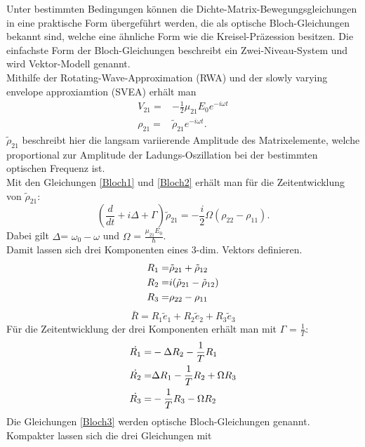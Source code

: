 Unter bestimmten Bedingungen können die Dichte-Matrix-Bewegungsgleichungen in eine praktische Form übergeführt werden, die als optische Bloch-Gleichungen bekannt sind, welche eine ähnliche Form wie die Kreisel-Präzession besitzen. Die einfachste Form der Bloch-Gleichungen beschreibt ein Zwei-Niveau-System und wird Vektor-Modell genannt.\\

Mithilfe der Rotating-Wave-Approximation (RWA) und der slowly varying envelope approxiamtion (SVEA) erhält man
\begin{align}
    V_{21}=& -\frac{1}{2}\mu_{21}E_0e^{-i\omega t} \label{Bloch1}\\
    \rho_{21} =& \tilde{\rho}_{21}e^{-i\omega t} \label{Bloch2}.
\end{align}
$\tilde{\rho}_{21}$ beschreibt hier die langsam variierende Amplitude des Matrixelemente, welche proportional zur Amplitude der Ladungs-Oszillation bei der bestimmten optischen Frequenz ist.\\
Mit den Gleichungen \ref{Bloch1} und \ref{Bloch2} erhält man für die Zeitentwicklung von $\tilde{\rho}_{21}$:
\begin{equation}
    \left( \frac{d}{dt} + i\Delta + \Gamma\right)\tilde{\rho}_{21}=-\frac{i}{2}\Omega(\rho_{22}-\rho_{11}).
\end{equation}
Dabei gilt $\Delta$= $\omega_0 - \omega$ und $\Omega$ = $\frac{\mu_{21}E_0}{\hbar}$.\\
Damit lassen sich drei Komponenten eines 3-dim. Vektors definieren.
\begin{align}
    R_1 =& \tilde{\rho}_{21} + \tilde{\rho}_{12}  \notag \\
    R_2 =& i(\tilde{\rho}_{21}-\tilde{\rho}_{12})\\
    R_3 =& \rho_{22} -\rho_{11} \notag
 \end{align}
 \begin{equation}
     \bar{R} = R_1\tilde{e}_1 + R_2\tilde{e}_2 + R_3\tilde{e}_3
 \end{equation}
 Für die Zeitentwicklung der drei Komponenten erhält man mit $\Gamma$ = $\frac{1}{T}$:
 \begin{align}
    \dot{R_1} =& -\Delta R_2 - \frac{1}{T}R_1  \notag \\
    \dot{R_2} =& \Delta R_1 - \frac{1}{T}R_2 + \Omega R_3 \label{Bloch3}\\
    \dot{R_3} =& - \frac{1}{T}R_3 - \Omega R_2 \notag
 \end{align}
 Die Gleichungen \ref{Bloch3} werden optische Bloch-Gleichungen genannt. Kompakter lassen sich die drei Gleichungen mit
